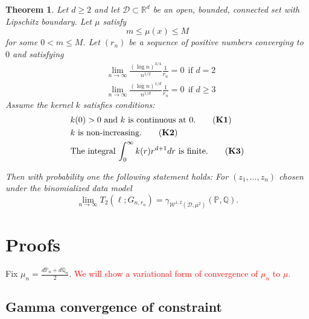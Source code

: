 \documentclass{article}
\newcommand{\Reals}{\mathbb{R}}
\newcommand{\Rd}{\Reals^d}
\newcommand{\lbf}{\bm{\ell}}
\newcommand{\Dset}{\mathcal{D}}
\newcommand{\Wset}{\mathcal{W}}
\newcommand{\Pbb}{\mathbb{P}}
\newcommand{\Qbb}{\mathbb{Q}}
\newcommand{\1}{\mathbf{1}}
\theoremstyle{alden}
\theoremstyle{aldenthm}
\newtheorem{theorem}{Theorem}
\theoremstyle{remark}
\begin{document}
\begin{theorem}
	\label{thm: LLN_for_t2}
	Let $d \geq 2$ and let $\Dset \subset \Rd$ be an open, bounded, connected set with Lipschitz boundary. Let $\mu$ satisfy
	\begin{equation*}
	m \leq \mu(x) \leq M \tag{$\forall x \in D$}
	\end{equation*}
	for some $0 < m \leq M$. Let $(r_n)$ be a sequence of positive numbers converging to $0$ and satisfying
	\begin{align*}
	& \lim_{n \to \infty} \frac{(\log n)^{3/4}}{n^{1/2}} \frac{1}{r_n} = 0 ~~ \text{if $d = 2$} \\
	& \lim_{n \to \infty} \frac{(\log n)^{1/d}}{n^{1/d}} \frac{1}{r_n} = 0 ~~ \text{if $d \geq 3$}
	\end{align*}
	Assume the kernel $k$ satisfies conditions: 
	\begin{align*}
	& k(0) > 0 ~ \text{and $k$ is continuous at $0$.} \tag{\textbf{K1}} \\
	& k~ \text{is non-increasing.} \tag{\textbf{K2}} \\
	& \text{The integral $\int_{0}^{\infty} k(r) r^{d+1} dr$ is finite.} \tag{\textbf{K3}}
	\end{align*}
	
	Then with probability one the following statement holds: For $(z_1, \ldots, z_n)$ chosen under the binomialized data model
	\begin{equation*}
	\lim_{n \to \infty} T_2(\lbf; G_{n,r_n}) = \gamma_{\Wset^{1,2}(\Dset,\mu^2)}(\Pbb,\Qbb).
	\end{equation*}
\end{theorem}

\section{Proofs}

Fix $\mu_n = \frac{d\Pbb_n + d\Qbb_n}{2}$. \textcolor{red}{We will show a variational form of convergence of $\mu_n$ to $\mu$.}

\subsection{Gamma convergence of constraint}
\end{document}
